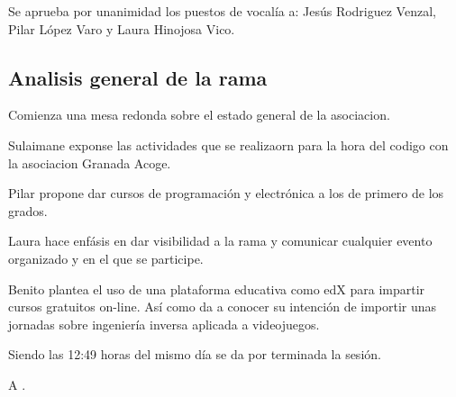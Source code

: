 \documentclass[12pt,twoside,openany,a4paper]{book}
\begin{document}
    Se aprueba por unanimidad los puestos de vocalía a: Jesús Rodriguez Venzal, Pilar López Varo y Laura Hinojosa Vico.

    \subsection{Analisis general de la rama}
    Comienza una mesa redonda sobre el estado general de la asociacion.

    Sulaimane exponse las actividades que se realizaorn para la hora del codigo con la asociacion Granada Acoge.

    Pilar propone dar cursos de programación y electrónica a los de primero de los grados.

    Laura hace enfásis en dar visibilidad a la rama y comunicar cualquier evento organizado y en el que se participe.

    Benito plantea el uso de una plataforma educativa como edX para impartir cursos gratuitos on-line. Así como da a conocer su intención de importir unas jornadas sobre ingeniería inversa aplicada a videojuegos.

    \clearpage
    Siendo las 12:49 horas del mismo día se da por terminada la sesión.

    A \Date.
    \vspace{10mm}
\end{document}
